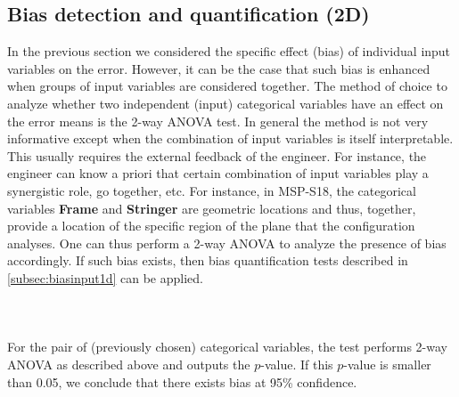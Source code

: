\subsection{Bias detection and quantification (2D)}
In the previous section we considered the specific effect (bias) of individual input variables on the error. However, it can be the case that such bias is enhanced when groups of input variables are considered together. 
The method of choice to analyze whether two independent (input) categorical variables have an effect on the error means is the 2-way ANOVA test\cite{fujikoshi1993two}.
In general the method is not very informative except when the combination of input variables is itself interpretable. This usually requires the external feedback of the engineer. For instance, the engineer can know a priori that certain combination of input variables play a synergistic role, go together, etc.
For instance, in MSP-S18, the categorical variables \textbf{Frame} and \textbf{Stringer} are geometric locations and thus, together, provide a location of the specific region of the plane that the configuration analyses. One can thus perform a 2-way ANOVA to analyze the presence of bias accordingly. If such bias exists, then bias quantification tests described in \autoref{subsec:biasinput1d} can be applied.\\
%
\paragraph{ \\}
For the pair of (previously chosen) categorical variables, the test performs 2-way ANOVA as described above and outputs the $p$-value. If this $p$-value is smaller than 0.05, we conclude that there exists bias at 95\% confidence.\\

